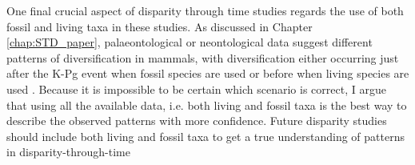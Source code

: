 One final crucial aspect of disparity through time studies regards the use of both fossil and living taxa in these studies.
As discussed in Chapter \ref{chap:STD_paper}, palaeontological or neontological data suggest different patterns of diversification in mammals, with diversification either occurring just after the K-Pg event when fossil species are used \citep[suggesting an effect of K-Pg;][]{O'Leary08022013} or before when living species are used \citep[rejecting an effect of K-Pg;][]{meredithimpacts2011,dosReis2014}.
Because it is impossible to be certain which scenario is correct, I argue that using all the available data, i.e. both living and fossil taxa \citep{Slater2012MEE,beckancient2014} is the best way to describe the observed patterns with more confidence.
Future disparity studies should include both living and fossil taxa to get a true understanding of patterns in disparity-through-time

